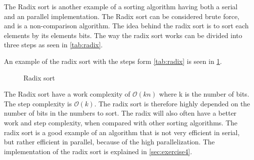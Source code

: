 The Radix sort is another example of a sorting algorithm having both a serial and an parallel implementation. The Radix sort can be considered brute force, and is a non-comparison algorithm. The idea behind the radix sort is to sort each elements by its elements bits. The way the radix sort works can be divided into three steps as seen in \cref{tab:radix}.

\begin{center}
	\label{tab:radix}
\end{center} 

An example of the radix sort with the steps form \cref{tab:radix} is seen in \cref{fig:sort_radix}.

\begin{figure}[ht]
	\centering
	\caption{Radix sort}
	\label{fig:sort_radix}
\end{figure}  

The Radix sort have a work complexity of $\mathcal{O}(kn)$ where k is the number of bits. The step complexity is $\mathcal{O}(k)$. The radix sort is therefore highly depended on the number of bits in the numbers to sort. The radix will also often have a better work and step complexity, when compared with other sorting algorithms. The radix sort is a good example of an algorithm that is not very efficient in serial, but rather efficient in parallel, because of the high parallelization. The implementation of the radix sort is explained in \cref{sec:exercise4}.   
